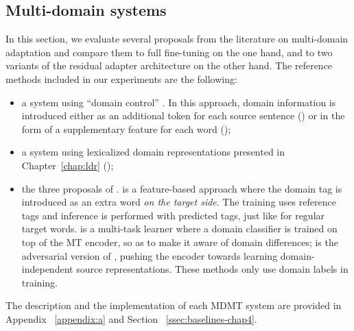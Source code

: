 \subsection{Multi-domain systems}
In this section, we evaluate several proposals from the literature on multi-domain adaptation and compare them to full fine-tuning on the one hand, and to two variants of the residual adapter architecture on the other hand.
The reference methods included in our experiments are the following:
\begin{itemize}
\item a system using ``domain control'' \citep{Kobus17domain}. In this approach, domain information is introduced either as an additional token for each source sentence () or in the form of a supplementary feature for each word ();
\item a system using lexicalized domain representations presented in Chapter~\ref{chap:ldr} ();
\item the three proposals of \citet{Britz17effective}.  is a feature-based approach where the domain tag is introduced as an extra word \textsl{on the target side}. The training uses reference tags and inference is performed with predicted tags, just like for regular target words.  is a multi-task learner where a domain classifier is trained on top of the MT encoder, so as to make it aware of domain differences;  is the adversarial version of , pushing the encoder towards learning domain-independent source representations. These methods only use domain labels in training.
\end{itemize}
The description and the implementation of each MDMT system are provided in Appendix ~\ref{appendix:a} and Section ~\ref{ssec:baselines-chap4}.
